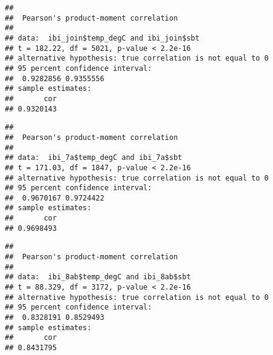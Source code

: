 \documentclass[
]{article}
\newenvironment{Shaded}{\begin{snugshade}}{\end{snugshade}}
\newcommand{\CommentTok}[1]{\textcolor[rgb]{0.56,0.35,0.01}{\textit{#1}}}
\newcommand{\FunctionTok}[1]{\textcolor[rgb]{0.00,0.00,0.00}{#1}}
\newcommand{\NormalTok}[1]{#1}
\newcommand{\OtherTok}[1]{\textcolor[rgb]{0.56,0.35,0.01}{#1}}
\newcommand{\SpecialCharTok}[1]{\textcolor[rgb]{0.00,0.00,0.00}{#1}}
\newcommand{\StringTok}[1]{\textcolor[rgb]{0.31,0.60,0.02}{#1}}
\begin{document}
\begin{verbatim}
## 
##  Pearson's product-moment correlation
## 
## data:  ibi_join$temp_degC and ibi_join$sbt
## t = 182.22, df = 5021, p-value < 2.2e-16
## alternative hypothesis: true correlation is not equal to 0
## 95 percent confidence interval:
##  0.9282856 0.9355556
## sample estimates:
##       cor 
## 0.9320143
\end{verbatim}

\begin{Shaded}
\end{Shaded}

\begin{verbatim}
## 
##  Pearson's product-moment correlation
## 
## data:  ibi_7a$temp_degC and ibi_7a$sbt
## t = 171.03, df = 1847, p-value < 2.2e-16
## alternative hypothesis: true correlation is not equal to 0
## 95 percent confidence interval:
##  0.9670167 0.9724422
## sample estimates:
##       cor 
## 0.9698493
\end{verbatim}

\begin{Shaded}
\end{Shaded}

\begin{verbatim}
## 
##  Pearson's product-moment correlation
## 
## data:  ibi_8ab$temp_degC and ibi_8ab$sbt
## t = 88.329, df = 3172, p-value < 2.2e-16
## alternative hypothesis: true correlation is not equal to 0
## 95 percent confidence interval:
##  0.8328191 0.8529493
## sample estimates:
##       cor 
## 0.8431795
\end{verbatim}
\end{document}
